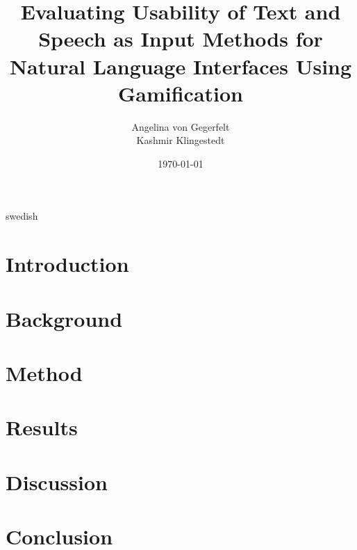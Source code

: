 \documentclass[a4paper,12pt]{kth-mag}
\title{Evaluating Usability of Text and Speech as Input Methods for Natural Language Interfaces Using Gamification}
\author{Angelina von Gegerfelt\\Kashmir Klingestedt}
\date{\today}
\begin{document}
\frontmatter
\pagestyle{empty}
\removepagenumbers
\maketitle
{}

\begin{abstract}
\end{abstract}

\begin{foreignabstract}{swedish}
\end{foreignabstract}
\newpage

\tableofcontents*
\mainmatter
\pagestyle{newchap}

\chapter{Introduction}


\chapter{Background}


\chapter{Method}


\chapter{Results}


\chapter{Discussion}


\chapter{Conclusion}


\newpage
{} %


\appendix
\end{document}
